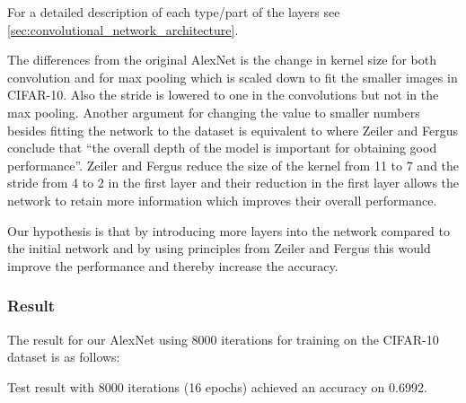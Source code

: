For a detailed description of each type/part of the layers see
\autoref{sec:convolutional_network_architecture}. 


The differences from the original AlexNet is the change in kernel size for both
convolution and for max pooling which is scaled down to fit the smaller
images in CIFAR-10. Also the stride is lowered to one in the convolutions but
not in the max pooling. Another argument for changing the value to smaller
numbers besides fitting the network to the dataset is equivalent to 
\cite{ZeilerFergus} where Zeiler and Fergus conclude that ``the overall depth of
the model is important for obtaining good performance''. Zeiler and
Fergus\cite{ZeilerFergus} reduce the size of the kernel from 11 to 7 and
the stride from 4 to 2 in the first layer and their reduction in the first layer
allows the network to retain more information which improves their overall
performance. 


Our hypothesis is that by introducing more layers into the network compared to
the initial network and by using principles from Zeiler and
Fergus\cite{ZeilerFergus} this would improve the performance
and thereby increase the accuracy.


\subsubsection{Result}

The result for our AlexNet using 8000 iterations for training on the CIFAR-10
dataset is as follows: 

Test result with 8000 iterations (16 epochs) achieved an accuracy on 0.6992. 


